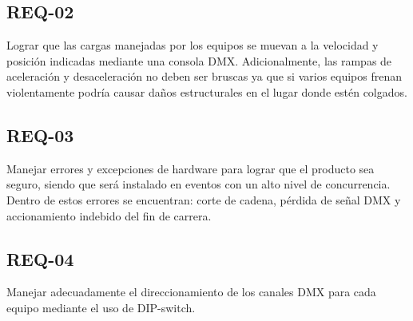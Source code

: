 \subsection{REQ-02}
Lograr que las cargas manejadas por los equipos se muevan a la velocidad y posición indicadas mediante una consola DMX. Adicionalmente, las rampas de aceleración y desaceleración no deben ser bruscas ya que si varios equipos frenan violentamente podría causar daños estructurales en el lugar donde estén colgados.
\subsection{REQ-03}
Manejar errores y excepciones de hardware para lograr que el producto sea seguro, siendo que será instalado en eventos con un alto nivel de concurrencia.\\
Dentro de estos errores se encuentran: corte de cadena, pérdida de señal DMX y accionamiento indebido del fin de carrera.
\subsection{REQ-04}
Manejar adecuadamente el direccionamiento de los canales DMX para cada equipo mediante el uso de DIP-switch. 







